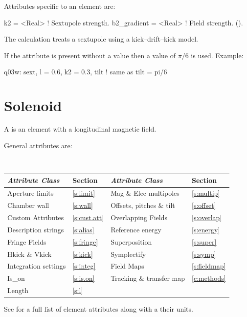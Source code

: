 {
Attributes specific to an  element are:
\begin{example}
  k2          = <Real>   ! Sextupole strength.
  b2_gradient = <Real>   ! Field strength. ().
\end{example}

The 
calculation treats a sextupole using a kick--drift--kick model.

If the  attribute is present without a value then a value of 
$\pi/6$ is used.
Example:
\begin{example}
  q03w: sext, l = 0.6, k2 = 0.3, tilt  ! same as tilt = pi/6
\end{example}

\section{Solenoid}
\label{s:sol}

A  is an element with a longitudinal magnetic field.

General  attributes are:
\begin{center}
\tt
\begin{tabular}{llll} \toprule
  {\sl Attribute Class}      & Section           & {\sl Attribute Class}      & Section            \\ \midrule
  Aperture limits            & \ref{s:limit}     & Mag \& Elec multipoles     & \ref{s:multip}     \\
  Chamber wall               & \ref{s:wall}      & Offsets, pitches \& tilt   & \ref{s:offset}     \\
  Custom Attributes          & \ref{s:cust.att}  & Overlapping Fields         & \ref{s:overlap}    \\
  Description strings        & \ref{s:alias}     & Reference energy           & \ref{s:energy}     \\ 
  Fringe Fields              & \ref{s:fringe}    & Superposition              & \ref{s:super}      \\
  Hkick \& Vkick             & \ref{s:kick}      & Symplectify                & \ref{s:symp}       \\
  Integration settings       & \ref{s:integ}     & Field Maps                 & \ref{s:fieldmap}   \\
  Is_on                      & \ref{s:is.on}     & Tracking \& transfer map   & \ref{c:methods}    \\ 
  Length                     & \ref{s:l}         &                            &                    \\ 
  \bottomrule
\end{tabular}
\end{center}
\toffset
See  for a full list of element attributes along with a their units.

}
